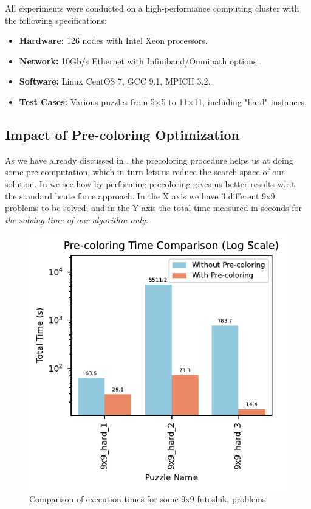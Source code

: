 All experiments were conducted on a high-performance computing cluster with the following specifications:
\begin{itemize}
    \item \textbf{Hardware:} 126 nodes with Intel Xeon processors.
    \item \textbf{Network:} 10Gb/s Ethernet with Infiniband/Omnipath options.
    \item \textbf{Software:} Linux CentOS 7, GCC 9.1, MPICH 3.2.
    \item \textbf{Test Cases:} Various puzzles from 5×5 to 11×11, including "hard" instances.
\end{itemize}

\subsection{Impact of Pre-coloring Optimization}
\label{subsec:precoloring_performance}
As we have already discussed in , the precoloring procedure helps us at doing some pre computation, which in turn lets us reduce the search space of our solution. In  we see how by performing precoloring gives us better results w.r.t. the standard brute force approach. In the X axis we have 3 different 9x9 problems to be solved, and in the Y axis the total time measured in seconds for \textit{the solving time of our algorithm only}.

\begin{figure}[htbp]
\centering
\includegraphics[width=0.9\linewidth]{imgs/precoloring_comparison.pdf}
\caption{Comparison of execution times for some 9x9 futoshiki problems}
\label{fig:precoloring_improvement}
\end{figure}


